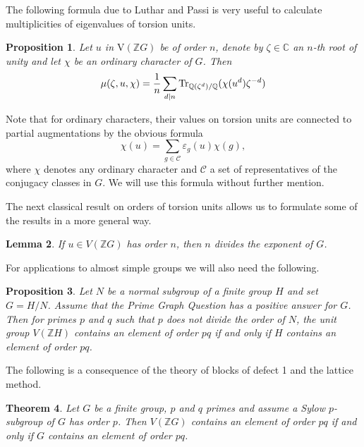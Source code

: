 \documentclass[11pt, a4paper]{amsart}
\newtheorem{theorem}{Theorem}[section]
\newtheorem{lemma}[theorem]{Lemma}
\newtheorem{proposition}[theorem]{Proposition}
\theoremstyle{definition}
\theoremstyle{definition}
\newcommand{\V}{\mathrm{V}}
\begin{document}
The following formula due to Luthar and Passi is very useful to calculate multiplicities of eigenvalues of torsion units.

\begin{proposition}\cite{LutharPassi}\label{pr:luthar-passi-multiplicity-formula}
   Let $u$ in $\V(\mathbb Z G)$ be of order $n$, denote by $\zeta\in \mathbb C$ an $n$-th root of unity and let $\chi$ be an ordinary character of $G$. Then 
   \[
       \mu(\zeta, u, \chi) =\frac{1}{n}\sum_{d|n} {\rm Tr}_{\mathbb Q(\zeta^d)/\mathbb Q} (\chi(u^d)\zeta^{-d})
   \] 
\end{proposition}

Note that for ordinary characters, their values on torsion units are connected to partial augmentations by the obvious formula
\[\chi(u) = \sum_{g \in \mathcal{C}} \varepsilon_g(u) \chi(g), \]
where $\chi$ denotes any ordinary character and $\mathcal{C}$ a set of representatives of the conjugacy classes in $G$. We will use this formula without further mention.

The next classical result on orders of torsion units allows us to formulate some of the results in a more general way.

\begin{lemma}\label{lem:CohnLivingstone}\cite{CohnLivingstone}
If $u \in V(\mathbb{Z}G)$ has order $n$, then $n$ divides the exponent of $G$.
\end{lemma}

For applications to almost simple groups we will also need the following.

\begin{proposition}\label{prop:KimmerleKonovalovQuotient}\cite[Proposition 2.2]{KimmerleKonovalov}
Let $N$ be a normal subgroup of a finite group $H$ and set $G = H/N$. Assume that the Prime Graph Question has a positive answer for $G$. Then for primes $p$ and $q$ such that $p$ does not divide the order of $N$, the unit group $V(\mathbb{Z}H)$ contains an element of order $pq$ if and only if $H$ contains an element of order $pq$.
\end{proposition}

The following is a consequence of the theory of blocks of defect 1 and the lattice method.

\begin{theorem}\label{th:CaicedoMargolis}\cite[Theorem 1.1]{CaicedoMargolis}
Let $G$ be a finite group, $p$ and $q$ primes and assume a Sylow $p$-subgroup of $G$ has order $p$. Then $V(\mathbb{Z}G)$ contains an element of order $pq$ if and only if $G$ contains an element of order $pq$.
\end{theorem}
\end{document}
